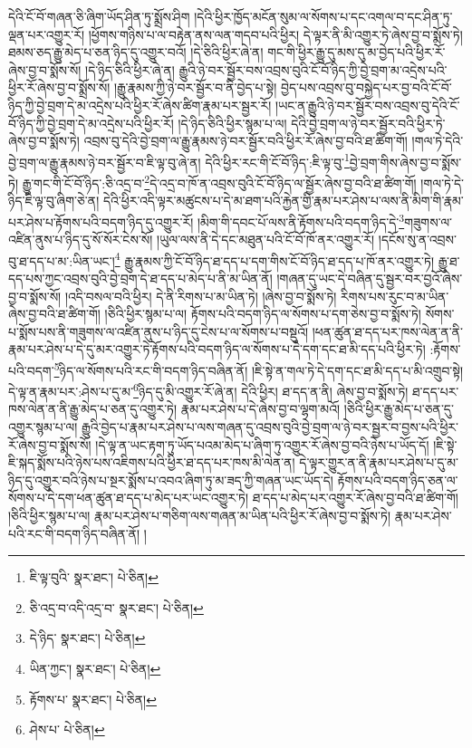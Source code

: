 དེའི་ངོ་བོ་གཞན་ཅི་ཞིག་ཡོད་ཤིན་ཏུ་སྨྲོས་ཤིག །དེའི་ཕྱིར་ཁྱོད་མངོན་སུམ་ལ་སོགས་པ་དང་འགལ་བ་དང་ཤིན་ཏུ་ལྡན་པར་འགྱུར་རོ། །ཕྱོགས་གཉིས་པ་ལ་བརྟེན་ནས་ལན་གདབ་པའི་ཕྱིར། དེ་ལྟར་ནི་མི་འགྱུར་ཏེ་ཞེས་བྱ་བ་སྨོས་ཏེ། ཐམས་ཅད་རྒྱུ་མེད་པ་ཅན་ཉིད་དུ་འགྱུར་བའོ། །དེ་ཅིའི་ཕྱིར་ཞེ་ན། གང་གི་ཕྱིར་རྒྱུ་དུ་མས་དུ་མ་བྱེད་པའི་ཕྱིར་རོ་ཞེས་བྱ་བ་སྨོས་སོ། །དེ་ཉིད་ཅིའི་ཕྱིར་ཞེ་ན། རྒྱུའི་ཉེ་བར་སྦྱོར་བས་འབྲས་བུའི་ངོ་བོ་ཉིད་ཀྱི་བྱེ་བྲག་མ་འདྲེས་པའི་ཕྱིར་རོ་ཞེས་བྱ་བ་སྨྲོས་སོ། །རྒྱུ་རྣམས་ཀྱི་ཉེ་བར་སྦྱོར་བ་ནི་བྱེད་པ་སྟེ། བྱེད་པས་འབྲས་བུ་བསྐྱེད་པར་བྱ་བའི་ངོ་བོ་ཉིད་ཀྱི་བྱེ་བྲག་དེ་མ་འདྲེས་པའི་ཕྱིར་རོ་ཞེས་ཚིག་རྣམ་པར་སྦྱར་རོ། །ཡང་ན་རྒྱུའི་ཉེ་བར་སྦྱོར་བས་འབྲས་བུ་དེའི་ངོ་བོ་ཉིད་ཀྱི་བྱེ་བྲག་དེ་མ་འདྲེས་པའི་ཕྱིར་རོ། །དེ་ཉིད་ཅིའི་ཕྱིར་སྙམ་པ་ལ། དེའི་བྱེ་བྲག་ལ་ཉེ་བར་སྦྱོར་བའི་ཕྱིར་ཏེ་ཞེས་བྱ་བ་སྨོས་ཏེ། འབྲས་བུ་དེའི་བྱེ་བྲག་ལ་རྒྱུ་རྣམས་ཉེ་བར་སྦྱོར་བའི་ཕྱིར་རོ་ཞེས་བྱ་བའི་ཐ་ཚིག་གོ། །གལ་ཏེ་དེའི་བྱེ་བྲག་ལ་རྒྱུ་རྣམས་ཉེ་བར་སྦྱོར་བ་ཇི་ལྟ་བུ་ཞེ་ན། དེའི་ཕྱིར་རང་གི་ངོ་བོ་ཉིད་:ཇི་ལྟ་བུ་\footnote{ཇི་ལྟ་བུའི་  སྣར་ཐང་།  པེ་ཅིན། }བྱེ་བྲག་གིས་ཞེས་བྱ་བ་སྨོས་ཏེ། རྒྱུ་གང་གི་ངོ་བོ་ཉིད་:ཅི་འདྲ་བ་\footnote{ཅི་འདྲ་བ་འདི་འདྲ་བ་  སྣར་ཐང་།  པེ་ཅིན། }དེ་འདྲ་བ་ཁོ་ན་འབྲས་བུའི་ངོ་བོ་ཉིད་ལ་སྦྱོར་ཞེས་བྱ་བའི་ཐ་ཚིག་གོ། །གལ་ཏེ་དེ་ཉིད་ཇི་ལྟ་བུ་ཞིག་ཅེ་ན། དེའི་ཕྱིར་འདི་ལྟར་མཚུངས་པ་དེ་མ་ཐག་པའི་རྐྱེན་གྱི་རྣམ་པར་ཤེས་པ་ལས་ནི་མིག་གི་རྣམ་པར་ཤེས་པ་རྟོགས་པའི་བདག་ཉིད་དུ་འགྱུར་རོ། །མིག་གི་དབང་པོ་ལས་ནི་རྟོགས་པའི་བདག་ཉིད་དེ་\footnote{དེ་ཉིད་  སྣར་ཐང་།  པེ་ཅིན། }གཟུགས་ལ་འཛིན་ནུས་པ་ཉིད་དུ་སོ་སོར་ངེས་སོ། །ཡུལ་ལས་ནི་དེ་དང་མཐུན་པའི་ངོ་བོ་ཁོ་ནར་འགྱུར་རོ། །དངོས་སུ་ན་འབྲས་བུ་ཐ་དད་པ་མ་:ཡིན་ཡང་།\footnote{ཡིན་ཀྱང་།  སྣར་ཐང་།  པེ་ཅིན། } རྒྱུ་རྣམས་ཀྱི་ངོ་བོ་ཉིད་ཐ་དད་པ་དག་གིས་ངོ་བོ་ཉིད་ཐ་དད་པ་ཁོ་ནར་འགྱུར་ཏེ། རྒྱུ་ཐ་དད་པས་ཀྱང་འབྲས་བུའི་བྱེ་བྲག་དེ་ཐ་དད་པ་མེད་པ་ནི་མ་ཡིན་ནོ། །གཞན་དུ་ཡང་དེ་བཞིན་དུ་སྦྱར་བར་བྱའོ་ཞེས་བྱ་བ་སྨོས་སོ། །འདི་བསལ་བའི་ཕྱིར། དེ་ནི་རིགས་པ་མ་ཡིན་ཏེ། །ཞེས་བྱ་བ་སྨོས་ཏེ། རིགས་པས་རུང་བ་མ་ཡིན་ཞེས་བྱ་བའི་ཐ་ཚིག་གོ། །ཅིའི་ཕྱིར་སྙམ་པ་ལ། རྟོགས་པའི་བདག་ཉིད་ལ་སོགས་པ་དག་ཅེས་བྱ་བ་སྨོས་ཏེ། སོགས་པ་སྨོས་པས་ནི་གཟུགས་ལ་འཛིན་ནུས་པ་ཉིད་དུ་ངེས་པ་ལ་སོགས་པ་བསྡུའོ། །ཕན་ཚུན་ཐ་དད་པར་ཁས་ལེན་ན་ནི་རྣམ་པར་ཤེས་པ་དེ་དུ་མར་འགྱུར་ཏེ་རྟོགས་པའི་བདག་ཉིད་ལ་སོགས་པ་དེ་དག་དང་ཐ་མི་དད་པའི་ཕྱིར་ཏེ། :རྟོགས་པའི་བདག་\footnote{རྟོགས་པ་  སྣར་ཐང་།  པེ་ཅིན། }ཉིད་ལ་སོགས་པའི་རང་གི་བདག་ཉིད་བཞིན་ནོ། །ཇི་སྟེ་ན་གལ་ཏེ་དེ་དག་དང་ཐ་མི་དད་པ་མི་འགྲུབ་སྟེ། དེ་ལྟ་ན་རྣམ་པར་:ཤེས་པ་དུ་མ་\footnote{ཤེས་པ་  པེ་ཅིན། }ཉིད་དུ་མི་འགྱུར་རོ་ཞེ་ན། དེའི་ཕྱིར། ཐ་དད་ན་ནི། ཞེས་བྱ་བ་སྨོས་ཏེ། ཐ་དད་པར་ཁས་ལེན་ན་ནི་རྒྱུ་མེད་པ་ཅན་དུ་འགྱུར་ཏེ། རྣམ་པར་ཤེས་པ་དེ་ཞེས་བྱ་བ་ལྷག་མའོ། །ཅིའི་ཕྱིར་རྒྱུ་མེད་པ་ཅན་དུ་འགྱུར་སྙམ་པ་ལ། རྒྱུའི་བྱེད་པ་རྣམ་པར་ཤེས་པ་ལས་གཞན་དུ་འབྲས་བུའི་བྱེ་བྲག་ལ་ཉེ་བར་སྦྱར་བ་བྱས་པའི་ཕྱིར་རོ་ཞེས་བྱ་བ་སྨོས་སོ། །དེ་ལྟ་ན་ཡང་རྟག་ཏུ་ཡོད་པའམ་མེད་པ་ཞིག་ཏུ་འགྱུར་རོ་ཞེས་བྱ་བའི་ཉེས་པ་ཡོད་དོ། །ཇི་སྟེ་ཇི་སྐད་སྨོས་པའི་ཉེས་པས་འཇིགས་པའི་ཕྱིར་ཐ་དད་པར་ཁས་མི་ལེན་ན། དེ་ལྟར་གྱུར་ན་ནི་རྣམ་པར་ཤེས་པ་དུ་མ་ཉིད་དུ་འགྱུར་བའི་ཉེས་པ་སྔར་སྨོས་པ་འབའ་ཞིག་ཏུ་མ་ཟད་ཀྱི་གཞན་ཡང་ཡོད་དེ། རྟོགས་པའི་བདག་ཉིད་ཅན་ལ་སོགས་པ་དེ་དག་ཕན་ཚུན་ཐ་དད་པ་མེད་པར་ཡང་འགྱུར་ཏེ། ཐ་དད་པ་མེད་པར་འགྱུར་རོ་ཞེས་བྱ་བའི་ཐ་ཚིག་གོ། །ཅིའི་ཕྱིར་སྙམ་པ་ལ། རྣམ་པར་ཤེས་པ་གཅིག་ལས་གཞན་མ་ཡིན་པའི་ཕྱིར་རོ་ཞེས་བྱ་བ་སྨོས་ཏེ། རྣམ་པར་ཤེས་པའི་རང་གི་བདག་ཉིད་བཞིན་ནོ། །
